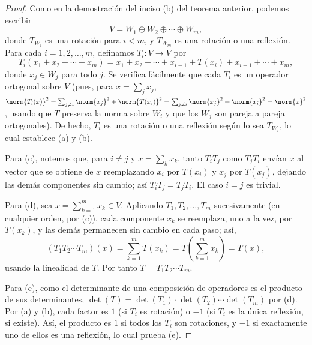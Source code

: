 \begin{proof}
    Como en la demostración del inciso (b) del teorema anterior, podemos escribir
    \begin{equation*}
        V=W_1\oplus W_2\oplus\cdots\oplus W_m,
    \end{equation*}
    donde $T_{W_i}$ es una rotación para $i<m$, y $T_{W_m}$ es una rotación o una reflexión. Para cada $i=1,2,\dots,m$, definamos $T_i:V\to V$ por
    \begin{equation*}
        T_i(x_1+x_2+\cdots+x_m)=x_1+x_2+\cdots+x_{i-1}+T(x_i)+x_{i+1}+\cdots+x_m,
    \end{equation*}
    donde $x_j\in W_j$ para todo $j$. Se verifica fácilmente que cada $T_i$ es un operador ortogonal sobre $V$ (pues, para $x=\sum_jx_j$, $\norm{T_i(x)}^2=\sum_{j\neq i}\norm{x_j}^2+\norm{T(x_i)}^2=\sum_{j\neq i}\norm{x_j}^2+\norm{x_i}^2=\norm{x}^2$, usando que $T$ preserva la norma sobre $W_i$ y que los $W_j$ son pareja a pareja ortogonales). De hecho, $T_i$ es una rotación o una reflexión según lo sea $T_{W_i}$, lo cual establece (a) y (b).

    Para (c), notemos que, para $i\neq j$ y $x=\sum_kx_k$, tanto $T_iT_j$ como $T_jT_i$ envían $x$ al vector que se obtiene de $x$ reemplazando $x_i$ por $T(x_i)$ y $x_j$ por $T(x_j)$, dejando las demás componentes sin cambio; así $T_iT_j=T_jT_i$. El caso $i=j$ es trivial.

    Para (d), sea $x=\sum_{k=1}^{m}x_k\in V$. Aplicando $T_1,T_2,\dots,T_m$ sucesivamente (en cualquier orden, por (c)), cada componente $x_k$ se reemplaza, uno a la vez, por $T(x_k)$, y las demás permanecen sin cambio en cada paso; así,
    \begin{equation*}
        (T_1T_2\cdots T_m)(x)=\sum_{k=1}^{m}T(x_k)=T\left(\sum_{k=1}^{m}x_k\right)=T(x),
    \end{equation*}
    usando la linealidad de $T$. Por tanto $T=T_1T_2\cdots T_m$.

    Para (e), como el determinante de una composición de operadores es el producto de sus determinantes, $\det(T)=\det(T_1)\cdot\det(T_2)\cdots\det(T_m)$ por (d). Por (a) y (b), cada factor es $1$ (si $T_i$ es rotación) o $-1$ (si $T_i$ es la única reflexión, si existe). Así, el producto es $1$ si todos los $T_i$ son rotaciones, y $-1$ si exactamente uno de ellos es una reflexión, lo cual prueba (e).
\end{proof}

